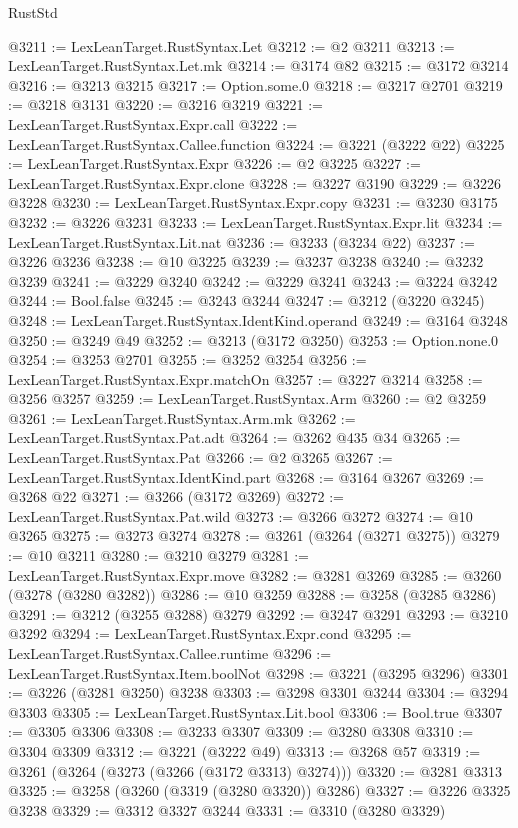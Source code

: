 \begin{lexlean}{RustStd}
\begin{coremodule}
{\begin{coremodule}
{{{{{{{{{{{{{{{{{{{{{{{{{{@3211 := LexLeanTarget.RustSyntax.Let
@3212 := @2 @3211
@3213 := LexLeanTarget.RustSyntax.Let.mk
@3214 := @3174 @82
@3215 := @3172 @3214
@3216 := @3213 @3215
@3217 := Option.some.{0}
@3218 := @3217 @2701
@3219 := @3218 @3131
@3220 := @3216 @3219
@3221 := LexLeanTarget.RustSyntax.Expr.call
@3222 := LexLeanTarget.RustSyntax.Callee.function
@3224 := @3221 (@3222 @22)
@3225 := LexLeanTarget.RustSyntax.Expr
@3226 := @2 @3225
@3227 := LexLeanTarget.RustSyntax.Expr.clone
@3228 := @3227 @3190
@3229 := @3226 @3228
@3230 := LexLeanTarget.RustSyntax.Expr.copy
@3231 := @3230 @3175
@3232 := @3226 @3231
@3233 := LexLeanTarget.RustSyntax.Expr.lit
@3234 := LexLeanTarget.RustSyntax.Lit.nat
@3236 := @3233 (@3234 @22)
@3237 := @3226 @3236
@3238 := @10 @3225
@3239 := @3237 @3238
@3240 := @3232 @3239
@3241 := @3229 @3240
@3242 := @3229 @3241
@3243 := @3224 @3242
@3244 := Bool.false
@3245 := @3243 @3244
@3247 := @3212 (@3220 @3245)
@3248 := LexLeanTarget.RustSyntax.IdentKind.operand
@3249 := @3164 @3248
@3250 := @3249 @49
@3252 := @3213 (@3172 @3250)
@3253 := Option.none.{0}
@3254 := @3253 @2701
@3255 := @3252 @3254
@3256 := LexLeanTarget.RustSyntax.Expr.matchOn
@3257 := @3227 @3214
@3258 := @3256 @3257
@3259 := LexLeanTarget.RustSyntax.Arm
@3260 := @2 @3259
@3261 := LexLeanTarget.RustSyntax.Arm.mk
@3262 := LexLeanTarget.RustSyntax.Pat.adt
@3264 := @3262 @435 @34
@3265 := LexLeanTarget.RustSyntax.Pat
@3266 := @2 @3265
@3267 := LexLeanTarget.RustSyntax.IdentKind.part
@3268 := @3164 @3267
@3269 := @3268 @22
@3271 := @3266 (@3172 @3269)
@3272 := LexLeanTarget.RustSyntax.Pat.wild
@3273 := @3266 @3272
@3274 := @10 @3265
@3275 := @3273 @3274
@3278 := @3261 (@3264 (@3271 @3275))
@3279 := @10 @3211
@3280 := @3210 @3279
@3281 := LexLeanTarget.RustSyntax.Expr.move
@3282 := @3281 @3269
@3285 := @3260 (@3278 (@3280 @3282))
@3286 := @10 @3259
@3288 := @3258 (@3285 @3286)
@3291 := @3212 (@3255 @3288) @3279
@3292 := @3247 @3291
@3293 := @3210 @3292
@3294 := LexLeanTarget.RustSyntax.Expr.cond
@3295 := LexLeanTarget.RustSyntax.Callee.runtime
@3296 := LexLeanTarget.RustSyntax.Item.boolNot
@3298 := @3221 (@3295 @3296)
@3301 := @3226 (@3281 @3250) @3238
@3303 := @3298 @3301 @3244
@3304 := @3294 @3303
@3305 := LexLeanTarget.RustSyntax.Lit.bool
@3306 := Bool.true
@3307 := @3305 @3306
@3308 := @3233 @3307
@3309 := @3280 @3308
@3310 := @3304 @3309
@3312 := @3221 (@3222 @49)
@3313 := @3268 @57
@3319 := @3261 (@3264 (@3273 (@3266 (@3172 @3313) @3274)))
@3320 := @3281 @3313
@3325 := @3258 (@3260 (@3319 (@3280 @3320)) @3286)
@3327 := @3226 @3325 @3238
@3329 := @3312 @3327 @3244
@3331 := @3310 (@3280 @3329)
}}}}}}}}}}}}}}}}}}}}}}}}}}
\end{coremodule}}
\end{coremodule}
\end{lexlean}

